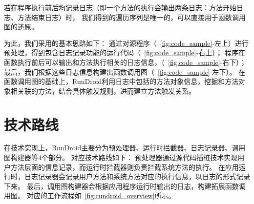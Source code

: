 若在程序执行前后均记录日志（即一个方法的执行会输出两条日志：方法开始日志、方法结束日志）时，
我们得到的遍历序列是唯一的，可以直接用于函数调用图的还原。

为此，我们采用的基本思路如下：
通过对源程序（~\autoref{fig:code_sample}-左上）进行预处理，得到包含日志记录功能的运行代码（~\autoref{fig:code_sample}-右上）；
程序在函数执行前后可以输出和方法执行相关的日志信息，（~\autoref{fig:code_sample}-右下）；
最后，我们根据这些日志信息构建出函数调用图（~\autoref{fig:code_sample}-左下）。
在函数调用图的基础上，RunDroid利用日志中包括的方法对象信息，挖掘和方法对象相关联的方法，结合具体触发规则，进而建立方法触发关系。


\section{技术路线}

在技术实现上，RunDroid主要分为预处理器、运行时拦截器、日志记录器、调用图构建器等4个部分。
对应技术路线如下：
预处理器通过源代码插桩技术实现用户方法层面的信息记录，而运行时拦截器则负责拦截系统方法的执行。
在应用运行时，日志记录器会记录用户方法和系统方法对应的执行信息，以日志的形式记录下来。
最后，调用图构建器会根据应用程序运行时输出的日志，构建拓展函数调用图。
对应的工作流程如~\autoref{fig:rundroid_overview}所示。




